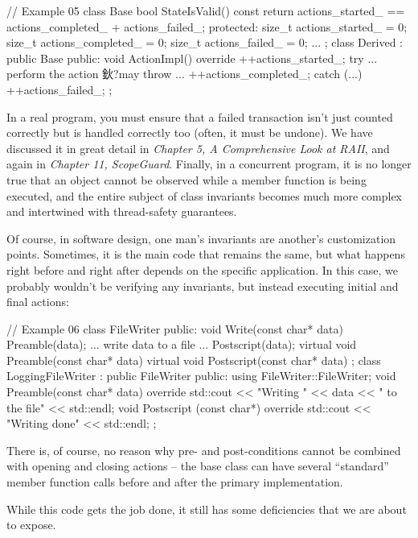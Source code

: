\begin{code}
// Example 05
class Base {
  bool StateIsValid() const {
    return actions_started_ ==
      actions_completed_ + actions_failed_;
  }
  protected:
  size_t actions_started_ = 0;
  size_t actions_completed_ = 0;
  size_t actions_failed_ = 0;
  ...
};
class Derived : public Base {
  public:
  void ActionImpl() override {
    ++actions_started_;
    try {
      ... perform the action 鈥?may throw ...
      ++actions_completed_;
    } catch (...) {
      ++actions_failed_;
    }
  }
};
\end{code}

In a real program, you must ensure that a failed transaction isn't just counted correctly but is handled correctly too (often, it must be undone). We have discussed it in great detail in \emph{Chapter 5, A Comprehensive Look at RAII}, and again in \emph{Chapter 11, ScopeGuard}. Finally, in a concurrent program, it is no longer true that an object cannot be observed while a member function is being executed, and the entire subject of class invariants becomes much more complex and intertwined with thread-safety guarantees.

Of course, in software design, one man's invariants are another's customization points. Sometimes, it is the main code that remains the same, but what happens right before and right after depends on the specific application. In this case, we probably wouldn't be verifying any invariants, but instead executing initial and final actions:

\begin{code}
// Example 06
class FileWriter {
  public:
  void Write(const char* data) {
    Preamble(data);
    ... write data to a file ...
    Postscript(data);
  }
  virtual void Preamble(const char* data) {}
  virtual void Postscript(const char* data) {}
};
class LoggingFileWriter : public FileWriter {
  public:
  using FileWriter::FileWriter;
  void Preamble(const char* data) override {
    std::cout << "Writing " << data << " to the file" <<
      std::endl;
  }
  void Postscript (const char*) override {
    std::cout << "Writing done" << std::endl;
  }
};
\end{code}

There is, of course, no reason why pre- and post-conditions cannot be combined with opening and closing actions -- the base class can have several ``standard'' member function calls before and after the primary implementation.

While this code gets the job done, it still has some deficiencies that we are about to expose.

